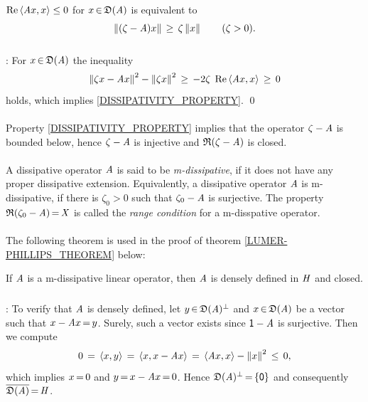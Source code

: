 \documentclass[11pt,twoside]{article}
\begin{document}
\begin{theorem}\label{DISSIPATIVITY_THEOREM}
$\operatorname{Re} \, \langle \mathit{A} x,x \rangle \leq 0$ for $x {\,\in\,} \mathfrak{D}(\mathit{A})$
is equivalent to
\begin{equation}\label{DISSIPATIVITY_PROPERTY}
\left\lVert (\zeta - \mathit{A})x \right\rVert \, \geq \, \zeta \left\lVert x \right\rVert \quad \quad (\zeta > 0).
\end{equation}
\end{theorem}

\subparagraph{}
\Proof:
For $x {\,\in\,} \mathfrak{D}(\mathit{A})$ the inequality
\[
\left\lVert \zeta x - \mathit{A} x \right\rVert^2 - \left\lVert \zeta x \right\rVert^2
\, \geq \,
- 2 \zeta \; \operatorname{Re} \, \langle \mathit{A} x,x \rangle
\, \geq \, 0
\]
holds,
which implies \eqref{DISSIPATIVITY_PROPERTY}.
\qed

\paragraph{}
Property \eqref{DISSIPATIVITY_PROPERTY} implies that the operator
$\zeta-\mathit{A}$ is bounded below,
hence $\zeta-\mathit{A}$ is injective and $\mathfrak{R}(\zeta-\mathit{A})$ is closed.

\paragraph{} %
A dissipative operator $\mathit{A}$ is said to be \textit{m-dissipative},
if it does not have any proper dissipative extension.
Equivalently,
a dissipative operator $\mathit{A}$ is m-dissipative,
if there is $\zeta_0 > 0$ such that $\zeta_0-\mathit{A}$ is surjective.
The property $\mathfrak{R}(\zeta_0-\mathit{A}) {\,=\,} \mathit{X}$ is called
the \textit{range condition} for a m-disspative operator.

\paragraph{} %
The following theorem is used
in the proof of theorem \ref{LUMER-PHILLIPS_THEOREM} below:

\begin{theorem}\label{DISSIPATIVE_OPERATOR_IS_DENSELY_DEFINED_AND_CLOSED}
If $\mathit{A}$ is a m-dissipative linear operator,
then $\mathit{A}$ is densely defined in $\mathit{H}$ and closed.
\end{theorem}

\subparagraph{}
\Proof:
To verify that $\mathit{A}$ is densely defined,
let $y {\,\in\,} \mathfrak{D}(\mathit{A}) ^{\bot}$
and $x {\,\in\,} \mathfrak{D}(\mathit{A}) $ be a vector
such that $x - \mathit{A} x {\,=\,} y$.
Surely,
such a vector exists since ${\mathsf{1}}-\mathit{A}$ is surjective.
Then we compute
\[
0 \,=\, \langle x,y \rangle \,=\,
\langle x,x- \mathit{A} x \rangle \,=\, \langle \mathit{A} x,x \rangle - \left\lVert x \right\rVert^2 \, \leq \, 0,
\]
which implies $x {\,=\,} 0$ and $y {\,=\,} x - \mathit{A} x {\,=\,} 0$.
Hence $\mathfrak{D}(\mathit{A}) ^{\bot} {\,=\,} \{{\mathsf{0}}\}$ and consequently
${\overline{ \mathfrak{D}(\mathit{A}) }} {\,=\,} \mathit{H}$.
\end{document}
